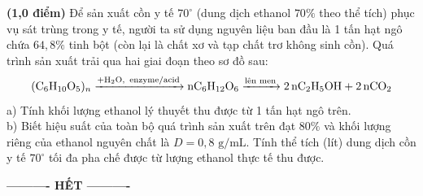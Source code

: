 \documentclass[11pt,a4paper]{article}
\begin{document}
\begin{ex}
\textbf{(1,0 điểm)} Để sản xuất cồn y tế $70^\circ$ (dung dịch ethanol $70\%$ theo thể tích) phục vụ sát trùng trong y tế, người ta sử dụng nguyên liệu ban đầu là 1 tấn hạt ngô chứa $64{,}8\%$ tinh bột (còn lại là chất xơ và tạp chất trơ không sinh cồn). Quá trình sản xuất trải qua hai giai đoạn theo sơ đồ sau:
\[ \ce{(C6H10O5)_n ->[+\ce{H2O},\, \text{enzyme/acid}] nC6H12O6 ->[\text{lên men}] 2nC2H5OH + 2nCO2} \]
a) Tính khối lượng ethanol lý thuyết thu được từ 1 tấn hạt ngô trên.\\
b) Biết hiệu suất của toàn bộ quá trình sản xuất trên đạt $80\%$ và khối lượng riêng của ethanol nguyên chất là $D = 0{,}8\text{ g/mL}$. Tính thể tích (lít) dung dịch cồn y tế $70^\circ$ tối đa pha chế được từ lượng ethanol thực tế thu được.

\end{ex}
\vspace{8pt}
\begin{center}
\textbf{---------- HẾT ----------}
\end{center}
\end{document}
